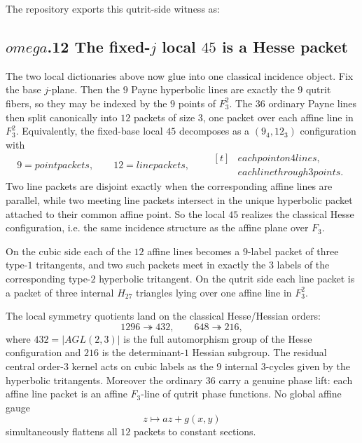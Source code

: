 \documentclass[12pt,a4paper]{article}
\def\mathbb#1{#1}%
\def\mathrm#1{#1}%
\def\text#1{#1}%
\def\omega{omega}%
\theoremstyle{definition}
\newcommand{\FF}{\mathbb{F}}
\begin{document}
The repository exports this qutrit-side witness as:
{\small\par\noindent{}\par}

\subsection*{$\omega$.12 \quad The fixed-$j$ local $45$ is a Hesse packet}

The two local dictionaries above now glue into one classical incidence object.
Fix the base $j$-plane.  Then the $9$ Payne hyperbolic lines are exactly the $9$
qutrit fibers, so they may be indexed by the $9$ points of $\FF_3^2$.
The $36$ ordinary Payne lines then split canonically into $12$ packets of size
$3$, one packet over each affine line in $\FF_3^2$.  Equivalently, the fixed-base
local $45$ decomposes as a $(9_4,12_3)$ configuration with
\[
9 = \text{point packets},
\qquad
12 = \text{line packets},
\qquad
\begin{aligned}[t]
&\text{each point on }4\text{ lines,}\\
&\text{each line through }3\text{ points}.
\end{aligned}
\]
Two line packets are disjoint exactly when the corresponding affine lines are
parallel, while two meeting line packets intersect in the unique hyperbolic
packet attached to their common affine point.  So the local $45$ realizes the
classical Hesse configuration, i.e. the same incidence structure as the affine
plane over $\FF_3$.

On the cubic side each of the $12$ affine lines becomes a $9$-label packet of
three type-$1$ tritangents, and two such packets meet in exactly the $3$ labels
of the corresponding type-$2$ hyperbolic tritangent.  On the qutrit side each
line packet is a packet of three internal $H_{27}$ triangles lying over one
affine line in $\FF_3^2$.

The local symmetry quotients land on the classical Hesse/Hessian orders:
\[
1296 \twoheadrightarrow 432,
\qquad
648 \twoheadrightarrow 216,
\]
where $432 = |\mathrm{AGL}(2,3)|$ is the full automorphism group of the Hesse
configuration and $216$ is the determinant-$1$ Hessian subgroup.  The residual
central order-$3$ kernel acts on cubic labels as the $9$ internal $3$-cycles
given by the hyperbolic tritangents.  Moreover the ordinary $36$ carry a genuine
phase lift: each affine line packet is an affine $\FF_3$-line of qutrit phase
functions.  No global affine gauge
\[
z \mapsto a z + g(x,y)
\]
simultaneously flattens all $12$ packets to constant sections.
\end{document}

